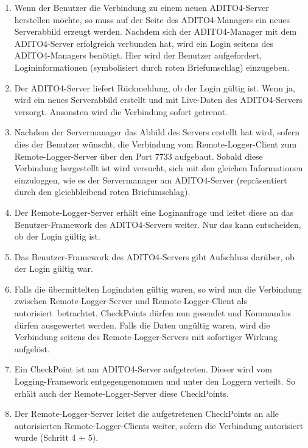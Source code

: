 \begin{enumerate}[leftmargin=0px]
\item Wenn der Benutzer die Verbindung zu einem neuen ADITO4-Server herstellen möchte, so muss auf der Seite des ADITO4-Managers ein neues Serverabbild erzeugt werden. Nachdem sich der ADITO4-Manager mit dem ADITO4-Server erfolgreich verbunden hat, wird ein Login seitens des ADITO4-Managers benötigt. Hier wird der Benutzer aufgefordert, Logininformationen (symbolisiert durch roten Briefumschlag) einzugeben.
\item Der ADITO4-Server liefert Rückmeldung, ob der Login gültig ist. Wenn ja, wird ein neues Serverabbild erstellt und mit Live-Daten des ADITO4-Servers versorgt. Ansonsten wird die Verbindung sofort getrennt.

\item Nachdem der Servermanager das Abbild des Servers erstellt hat wird, sofern dies der Benutzer wünscht, die Verbindung vom Remote-Logger-Client zum Remote-Logger-Server über den Port 7733 aufgebaut. Sobald diese Verbindung hergestellt ist wird versucht, sich mit den gleichen Informationen einzuloggen, wie es der Servermanager am ADITO4-Server (repräsentiert durch den gleichbleibend roten Briefumschlag).
\item Der Remote-Logger-Server erhält eine Loginanfrage und leitet diese an das Benutzer-Framework des ADITO4-Servers weiter. Nur das kann entscheiden, ob der Login gültig ist.
\item Das Benutzer-Framework des ADITO4-Servers gibt Aufschluss darüber, ob der Login gültig war.
\item Falls die übermittelten Logindaten gültig waren, so wird nun die Verbindung zwischen Remote-Logger-Server und Remote-Logger-Client als \glqq autorisiert\grqq\ betrachtet. CheckPoints dürfen nun gesendet und Kommandos dürfen ausgewertet werden. Falls die Daten ungültig waren, wird die Verbindung seitens des Remote-Logger-Servers mit sofortiger Wirkung aufgelöst.

\item Ein CheckPoint ist am ADITO4-Server aufgetreten. Dieser wird vom Logging-Framework entgegengenommen und unter den Loggern verteilt. So erhält auch der Remote-Logger-Server diese CheckPoints.
\item Der Remote-Logger-Server leitet die aufgetretenen CheckPoints an alle autorisierten Remote-Logger-Clients weiter, sofern die Verbindung autorisiert wurde (Schritt 4 + 5).
\end{enumerate}
\newpage